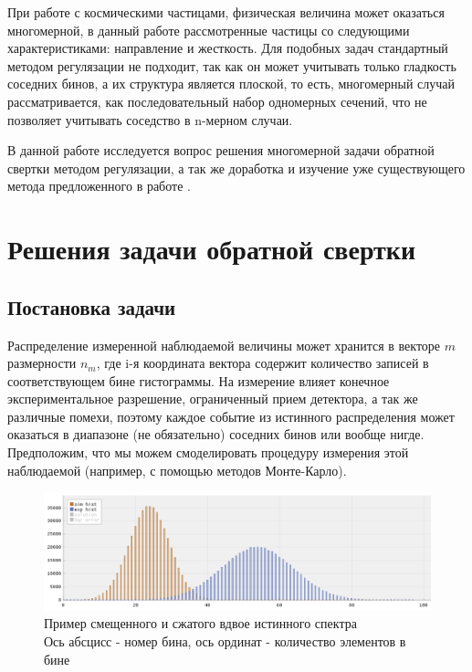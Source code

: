 \documentclass[a4paper,12pt]{diplom}
\begin{document}
При работе с космическими частицами, физическая величина может оказаться многомерной, в данный работе  рассмотренные частицы со следующими
характеристиками: направление и жесткость. Для подобных задач стандартный методом регулязации не подходит, так как он может учитывать
только гладкость соседних бинов, а их структура является плоской, то есть, многомерный случай рассматривается, как последовательный набор
одномерных сечений, что не позволяет учитывать соседство в n-мерном случаи.

В данной работе исследуется вопрос решения многомерной задачи обратной свертки методом регулязации, а так же доработка и изучение уже
существующего метода предложенного в работе \cite{SvdHocker}.



\chapter{Решения задачи обратной свертки}
\section{Постановка задачи}

Распределение измеренной наблюдаемой величины может хранится в векторе $m$ размерности $n_{m}$, где i-я координата вектора содержит 
количество записей в соответствующем бине гистограммы. На измерение влияет конечное экспериментальное разрешение, ограниченный прием 
детектора, а так же различные помехи, поэтому каждое событие из истинного распределения может оказаться в диапазоне (не обязательно) 
соседних бинов или вообще нигде. Предположим, что мы можем смоделировать процедуру измерения этой наблюдаемой (например, с помощью 
методов Монте-Карло). 

\begin{figure}[!ht]
   \includegraphics[width=\linewidth]{images/gaus_dist.png}
   \caption{Пример смещенного и сжатого вдвое истинного спектра \\
   Ось абсцисс - номер бина, ось ординат - количество элементов в бине }
   \label{photo:gaus_dist}
 \end{figure}
\end{document}

